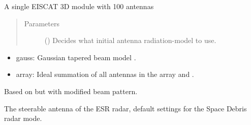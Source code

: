 \documentclass[letterpaper,10pt,english]{sphinxmanual}
\begin{document}
\begin{fulllineitems}
\label{\detokenize{modules/radar_library:radar_library.eiscat_3d_module}}
A single EISCAT 3D module with 100 antennas
\begin{quote}\begin{description}
\item[{Parameters}] \leavevmode
{} () \textendash{} Decides what initial antenna radiation-model to use.

\end{description}\end{quote}

\begin{itemize}
\item {} 
gauss: Gaussian tapered beam model {\hyperref[\detokenize{modules/antenna_library:antenna_library.planar_beam}]{}}.

\item {} 
array: Ideal summation of all antennas in the array {\hyperref[\detokenize{modules/antenna_library:antenna_library.e3d_array_beam_stage1}]{}} and {\hyperref[\detokenize{modules/antenna_library:antenna_library.e3d_array_beam}]{}}.

\end{itemize}

Based on {\hyperref[\detokenize{modules/radar_library:radar_library.eiscat_3d}]{}} but with modified beam pattern.

\end{fulllineitems}


\begin{fulllineitems}
\label{\detokenize{modules/radar_library:radar_library.eiscat_svalbard}}
The steerable antenna of the ESR radar, default settings for the Space Debris radar mode.

\end{fulllineitems}
\end{document}
